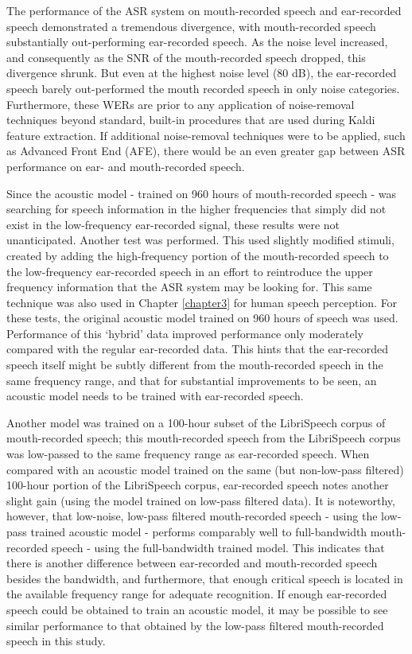 The performance of the ASR system on mouth-recorded speech and ear-recorded speech demonstrated a tremendous divergence, with mouth-recorded speech substantially out-performing ear-recorded speech.  As the noise level increased, and consequently as the SNR of the mouth-recorded speech dropped, this divergence shrunk.  But even at the highest noise level (80 dB), the ear-recorded speech barely out-performed the mouth recorded speech in only noise categories.  Furthermore, these WERs are prior to any application of noise-removal techniques beyond standard, built-in procedures that are used during Kaldi feature extraction.  If additional noise-removal techniques were to be applied, such as Advanced Front End (AFE), there would be an even greater gap between ASR performance on ear- and mouth-recorded speech.

Since the acoustic model - trained on 960 hours of mouth-recorded speech - was searching for speech information in the higher frequencies that simply did not exist in the low-frequency ear-recorded signal, these results were not unanticipated.  Another test was performed. This used slightly modified stimuli, created by adding the high-frequency portion of the mouth-recorded speech to the low-frequency ear-recorded speech in an effort to reintroduce the upper frequency information that the ASR system may be looking for.  This same technique was also used in Chapter \ref{chapter3} for human speech perception.  For these tests, the original acoustic model trained on 960 hours of speech was used.  Performance of this `hybrid' data improved performance only moderately compared with the regular ear-recorded data.  This hints that the ear-recorded speech itself might be subtly different from the mouth-recorded speech in the same frequency range, and that for substantial improvements to be seen, an acoustic model needs to be trained with ear-recorded speech.


Another model was trained on a 100-hour subset of the LibriSpeech corpus of mouth-recorded speech; this mouth-recorded speech from the LibriSpeech corpus was low-passed to the same frequency range as ear-recorded speech.  When compared with an acoustic model trained on the same (but non-low-pass filtered) 100-hour portion of the LibriSpeech corpus, ear-recorded speech notes another slight gain (using the model trained on low-pass filtered data).  It is noteworthy, however, that low-noise, low-pass filtered mouth-recorded speech - using the low-pass trained acoustic model - performs comparably well to full-bandwidth mouth-recorded speech - using the full-bandwidth trained model.  This indicates that there is another difference between ear-recorded and mouth-recorded speech besides the bandwidth, and furthermore, that enough critical speech is located in the available frequency range for adequate recognition.  If enough ear-recorded speech could be obtained to train an acoustic model, it may be possible to see similar performance to that obtained by the low-pass filtered mouth-recorded speech in this study.

